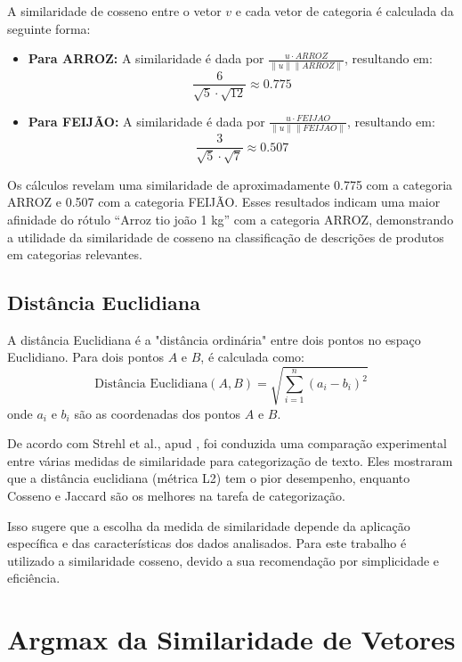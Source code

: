 A similaridade de cosseno entre o vetor \(v\) e cada vetor de categoria é calculada da seguinte forma:

\begin{itemize}
    \item \textbf{Para ARROZ:} A similaridade é dada por \(\frac{u \cdot ARROZ}{\|u\|\|ARROZ\|}\), resultando em:
    \[\frac{6}{\sqrt{5} \cdot \sqrt{12}} \approx 0.775\]

    \item \textbf{Para FEIJÃO:} A similaridade é dada por \(\frac{u \cdot FEIJAO}{\|u\|\|FEIJAO\|}\), resultando em:
    \[\frac{3}{\sqrt{5} \cdot \sqrt{7}} \approx 0.507\]
\end{itemize}

Os cálculos revelam uma similaridade de aproximadamente 0.775 com a categoria ARROZ e 0.507 com a categoria FEIJÃO. Esses resultados indicam uma maior afinidade do rótulo ``Arroz tio joão 1 kg'' com a categoria ARROZ, demonstrando a utilidade da similaridade de cosseno na classificação de descrições de produtos em categorias relevantes.


\subsection{Distância Euclidiana}
A distância Euclidiana é a "distância ordinária" entre dois pontos no espaço Euclidiano. Para dois pontos $A$ e $B$, é calculada como:
\begin{equation}
    \text{Distância Euclidiana}(A, B) = \sqrt{\sum_{i=1}^{n} (a_i - b_i)^2}
\end{equation}
onde $a_i$ e $b_i$ são as coordenadas dos pontos $A$ e $B$.

De acordo com Strehl et al., apud \cite{deng2019feature}, foi conduzida uma comparação experimental entre várias medidas de similaridade para categorização de texto. Eles mostraram que a distância euclidiana (métrica L2) tem o pior desempenho, enquanto Cosseno e Jaccard são os melhores na tarefa de categorização. 

Isso sugere que a escolha da medida de similaridade depende da aplicação específica e das características dos dados analisados. Para este trabalho é utilizado a similaridade cosseno, devido a sua recomendação por simplicidade e eficiência.

\section{Argmax da Similaridade de Vetores}

